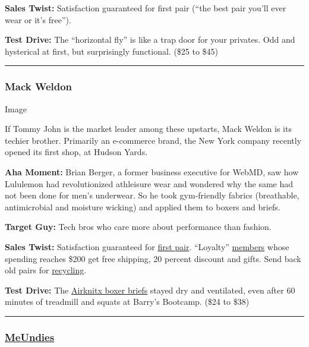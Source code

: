 \textbf{Sales Twist:} Satisfaction guaranteed for first pair (``the best
pair you'll ever wear or it's free'').

\textbf{Test Drive:} The ``horizontal fly'' is like a trap door for your
privates. Odd and hysterical at first, but surprisingly functional.
(\$25 to \$45)

\begin{center}\rule{0.5\linewidth}{\linethickness}\end{center}

\hypertarget{mack-weldon}{%
\subsubsection{Mack Weldon}\label{mack-weldon}}

Image

If Tommy John is the market leader among these upstarts, Mack Weldon is
its techier brother. Primarily an e-commerce brand, the New York company
recently opened its first shop, at Hudson Yards.

\textbf{Aha Moment:} Brian Berger, a former business executive for
WebMD, saw how Lululemon had revolutionized athleisure wear and wondered
why the same had not been done for men's underwear. So he took
gym-friendly fabrics (breathable, antimicrobial and moisture wicking)
and applied them to boxers and briefs.

\textbf{Target Guy:} Tech bros who care more about performance than
fashion.

\textbf{Sales Twist:} Satisfaction guaranteed for
\href{https://help.mackweldon.com/hc/en-us/articles/360000864934-What-is-your-Try-On-Guarantee-}{first
pair}. ``Loyalty'' \href{https://www.mackweldon.com/loyalty}{members}
whose spending reaches \$200 get free shipping, 20 percent discount and
gifts. Send back old pairs for
\href{https://www.mackweldon.com/recycle}{recycling}.

\textbf{Test Drive:} The
\href{https://www.mackweldon.com/products/airknitx-boxer-brief}{Airknitx
boxer briefs} stayed dry and ventilated, even after 60 minutes of
treadmill and squats at Barry's Bootcamp. (\$24 to \$38)

\begin{center}\rule{0.5\linewidth}{\linethickness}\end{center}

\hypertarget{meundies}{%
\subsubsection{\texorpdfstring{\textbf{\href{https://meundies.com/}{MeUndies}}}{MeUndies}}\label{meundies}}

